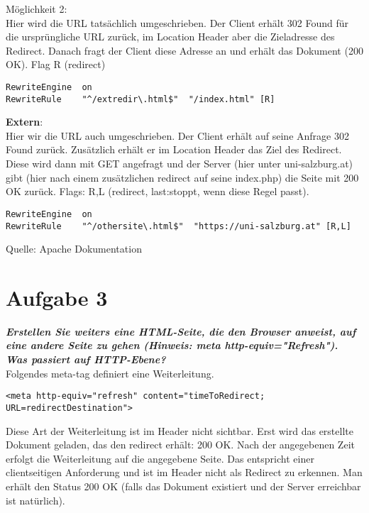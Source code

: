 \documentclass[12pt, a4paper]{report}
\begin{document}
Möglichkeit 2:\\
Hier wird die URL tatsächlich umgeschrieben. Der Client erhält 302 Found für die ursprüngliche URL zurück, im Location Header
aber die Zieladresse des Redirect. Danach fragt der Client diese Adresse an und erhält das Dokument (200 OK). Flag R (redirect)
\begin{verbatim}
RewriteEngine  on
RewriteRule    "^/extredir\.html$"  "/index.html" [R]
\end{verbatim}

\textbf{Extern}:\\
Hier wir die URL auch umgeschrieben. Der Client erhält auf seine Anfrage 302 Found zurück. Zusätzlich erhält er im 
Location Header das Ziel des Redirect. Diese wird dann mit GET angefragt und der Server (hier unter uni-salzburg.at) gibt (hier nach einem zusätzlichen redirect auf seine index.php) die Seite mit 200 OK zurück.
Flags: R,L (redirect, last:stoppt, wenn diese Regel passt).
\begin{verbatim}
RewriteEngine  on
RewriteRule    "^/othersite\.html$"  "https://uni-salzburg.at" [R,L]
\end{verbatim}
Quelle: Apache Dokumentation

\section*{Aufgabe 3}
\textbf{\textit{Erstellen Sie weiters eine HTML-Seite, die den Browser anweist, auf eine andere Seite zu gehen (Hinweis: meta http-equiv="Refresh"). Was passiert auf HTTP-Ebene?}}\\
Folgendes meta-tag definiert eine Weiterleitung.
\begin{verbatim}
<meta http-equiv="refresh" content="timeToRedirect; URL=redirectDestination">
\end{verbatim}
Diese Art der Weiterleitung ist im Header nicht sichtbar. Erst wird das erstellte Dokument geladen, das den redirect erhält: 200 OK. Nach der angegebenen Zeit
erfolgt die Weiterleitung auf die angegebene Seite. Das entspricht einer clientseitigen Anforderung und ist im Header nicht als Redirect zu erkennen. Man erhält
den Status 200 OK (falls das Dokument existiert und der Server erreichbar ist natürlich).
\end{document}

